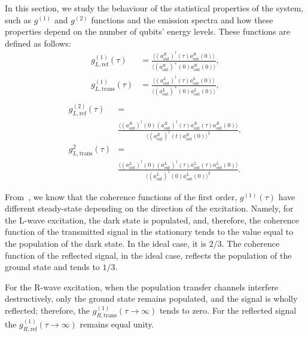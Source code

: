 \documentclass[lettersize,journal]{IEEEtran}
\begin{document}
In this section, we study the behaviour of the statistical properties of the system, such as $g^{(1)}$ and $g^{(2)}$ functions and the emission spectra and how these properties depend on the number of qubits' energy levels.
These functions are defined as follows:
\begin{equation}\label{eq:20}
    \begin{aligned}
        g^{(1)}_{L,\mathrm{ref}}\left(\tau \right)  &= \frac{\langle (a^{R}_\mathrm{out})^\dag (\tau) a^{R}_\mathrm{out}(0) \rangle}{\langle (a^{R}_\mathrm{out})^+(0) a^{R}_\mathrm{out}(0) \rangle}, \\
        g^{(1)}_{L,\mathrm{trans}}\left(\tau \right)  &= \frac{\langle (a^{L}_\mathrm{out})^\dag (\tau) a^{L}_\mathrm{out}(0) \rangle}{\langle (a^{L}_\mathrm{out})^+(0) a^{L}_\mathrm{out}(0) \rangle}, \\
    \end{aligned}
\end{equation}
\begin{equation}\label{eq:21}
    \begin{aligned}
        g^{(2)}_{L,\mathrm{ref}}\left(\tau \right)  &= \\
        &\frac{\langle (a^{R}_\mathrm{out})^\dag (0) (a^{R}_\mathrm{out})^\dag (\tau) a^{R}_\mathrm{out}(\tau) a^{R}_\mathrm{out}(0)\rangle}{\langle (a^{R}_\mathrm{out})^\dag (t) a^{R}_\mathrm{out}(0) \rangle^2}, \\
        g^{2}_{L,\mathrm{trans}}\left(\tau \right)  &= \\
        &\frac{\langle (a^{L}_\mathrm{out})^\dag (0) (a^{L}_\mathrm{out})^\dag (\tau) a^{L}_\mathrm{out}(\tau) a^{L}_\mathrm{out}(0)\rangle}{\langle (a^{L}_\mathrm{out})^\dag (0) a^{L}_\mathrm{out}(0) \rangle^2}.
    \end{aligned}
\end{equation}

From~\cite{muller_nonreciprocal_2017}, we know that the coherence functions of the first order, $g^{(1)}(\tau)$ have different steady-state depending on the direction of the excitation.
Namely, for the L-wave excitation, the dark state is populated, and, therefore, the coherence function of the transmitted signal in the stationary tends to the value equal to the population of the dark state.
In the ideal case, it is $2/3$.
The coherence function of the reflected signal, in the ideal case, reflects the population of the ground state and tends to $1/3$.

For the R-wave excitation, when the population transfer channels interfere destructively, only the ground state remains populated, and the signal is wholly reflected; therefore, the $g^{(1)}_{R, \mathrm{trans}}(\tau \rightarrow \infty)$ tends to zero.
For the reflected signal the $g^{(1)}_{R, \mathrm{ref}}(\tau \rightarrow \infty)$ remains equal unity.
\end{document}
